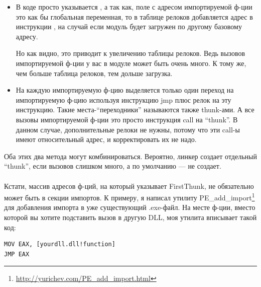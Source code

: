 \begin{itemize}
\item
В коде просто указывается , а так как, поле с адресом импортируемой ф-ции это
как бы глобальная переменная, то в таблице релоков добавляется адрес в инструкции , 
на случай если модуль будет загружен по другому базовому адресу.

Но как видно, это приводит к увеличению таблицы релоков. Ведь вызовов импортируемой ф-ции у вас в модуле может быть
очень много. К тому же, чем больше таблица релоков, тем дольше загрузка.

\item
На каждую импортируемую ф-цию выделяется только один переход на импортируемую ф-цию используя инструкцию jmp плюс 
релок на эту инструкцию. Такие места-``переходники'' называются также thunk-ами. 
А все вызовы импортируемой ф-ции это просто инструкция call на ``thunk''. В данном случае, дополнительные релоки
не нужны, потому что эти call-ы имеют относительный адрес, и корректировать их не надо.
\end{itemize}

Оба этих два метода могут комбинироваться. 
Вероятно, линкер создает отдельный ``thunk'', если вызовов слишком много, а по умолчанию --- не создает. \\
\\
Кстати, массив адресов ф-ций, на который указывает FirstThunk, не обязательно может быть в секции импортов.
К примеру, я написал утилиту PE\_add\_import\footnote{\url{http://yurichev.com/PE_add_import.html}} для добавления
импорта в уже существующий .exe-файл. На месте ф-ции, вместо которой вы хотите подставить вызов в другую DLL,
моя утилита вписывает такой код:

\begin{lstlisting}
MOV EAX, [yourdll.dll!function]
JMP EAX
\end{lstlisting}

